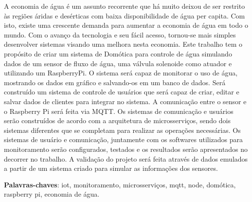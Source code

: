 \documentclass[
	12pt,				%
	oneside,
	a4paper,			%
	english,			%
	brazil				%
	]{abntex2ufop} %
\begin{document}
\setlength{\absparsep}{18pt} %
\begin{resumo}
 \noindent
 A economia de água é um assunto recorrente que há muito deixou de ser restrito às regiões áridas e desérticas com baixa disponibilidade de água per capita. Com isto, existe uma crescente demanda para aumentar a economia de água em todo o mundo. Com o avanço da tecnologia e seu fácil acesso, tornou-se mais simples desenvolver sistemas visando uma melhora nesta economia. Este trabalho tem o propósito de criar um sistema de Domótica para controle de água simulando dados de um sensor de fluxo de água, uma válvula solenoide como atuador e utilizando um RaspberryPi. O sistema será capaz de monitorar o uso de água, mostrando os dados em gráfico e salvando-os em um banco de dados. Será construído um sistema de controle de usuários que será capaz de criar, editar e salvar dados de clientes para integrar no sistema. A comunicação entre o sensor e o Raspberry Pi será feita via MQTT. Os sistemas de comunicação e usuários serão construídos de acordo com a arquitetura de microsserviços, sendo dois sistemas diferentes que se completam para realizar as operações necessárias. Os sistemas de usuário e comunicação, juntamente com os softwares utilizados para monitoramento serão configurados, testados e os resultados serão apresentados no decorrer no trabalho. A validação do projeto será feita através de dados emulados a partir de um sistema criado para simular as informações dos sensores.

 \textbf{Palavras-chaves}: iot, monitoramento, microsserviços, mqtt, node, domótica, raspberry pi, economia de água.
\end{resumo}
\end{document}
